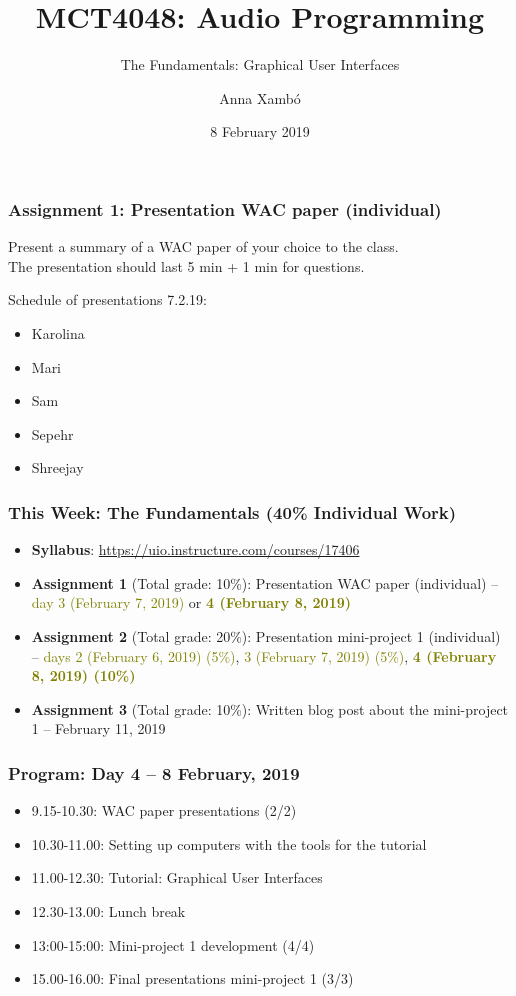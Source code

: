 \documentclass[screen, aspectratio=43]{beamer}
\title[AP-intro]{MCT4048: Audio Programming}
\subtitle{The Fundamentals: Graphical User Interfaces}
\author[A. Xamb{\'o}]{Anna Xamb{\'o}}
\institute[NTNU]{Department of Music, NTNU}
\date{8 February 2019}
\begin{document}
\begin{frame}
  \titlepage
\end{frame}

%
\begin{frame}
\frametitle{Assignment 1: Presentation WAC paper (individual)}

Present a summary of a WAC paper of your choice to the class.\\ 
The presentation should last 5 min + 1 min for questions.

\vspace{10 mm}

Schedule of presentations 7.2.19:
\begin{itemize}
\item Karolina
\item Mari
\item Sam
\item Sepehr
\item Shreejay
\end{itemize}
\end{frame}
%
\begin{frame}
\frametitle{This Week: The Fundamentals (40\% Individual Work)}
\begin{itemize}
\item \textbf{Syllabus}: \url{https://uio.instructure.com/courses/17406}
\item \textbf{Assignment 1} (Total grade: 10\%): Presentation WAC paper (individual) -- \textcolor{olive}{day 3 (February 7, 2019)} or \textbf{\textcolor{olive}{4 (February 8, 2019)}}
\item \textbf{Assignment 2} (Total grade: 20\%): Presentation mini-project 1 (individual) -- \textcolor{olive}{days 2 (February 6, 2019) (5\%)}, \textcolor{olive}{3 (February 7, 2019) (5\%)}, \textbf{\textcolor{olive}{4 (February 8, 2019) (10\%)}}
\item \textbf{Assignment 3} (Total grade: 10\%): Written blog post about the mini-project 1 -- February 11, 2019
\end{itemize}
\end{frame}
%
\begin{frame}
\frametitle{Program: Day 4 -- 8 February, 2019}
\begin{itemize}
\item 9.15-10.30: WAC paper presentations (2/2)
\item 10.30-11.00: Setting up computers with the tools for the tutorial
\item 11.00-12.30: Tutorial: Graphical User Interfaces
\item 12.30-13.00: Lunch break
\item 13:00-15:00: Mini-project 1 development (4/4)
\item 15.00-16.00: Final presentations mini-project 1 (3/3)
\end{itemize}
\end{frame}
\end{document}

